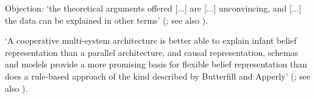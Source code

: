 \documentclass[12pt]{extarticle}
\begin{document}
\begin{multicols*}{3}
Objection:
‘the theoretical arguments offered [...] are [...] unconvincing, and [...]
the data can be explained in other terms’
(\citealp{carruthers:2015_two}; see also \citealp{carruthers:2015_mindreading}).

‘A cooperative multi-system architecture is better able to explain infant belief representation than a
parallel architecture, and causal representation, schemas and models provide a more promising basis
for flexible belief representation than does a rule-based approach of the kind described by Butterfill
and Apperly’ (\citealp{christensen:_twoa}; see also \citealp{michael:2016_flexible,michael:2013_mindreading}).


    




\footnotesize


\end{multicols*}
\end{document}

